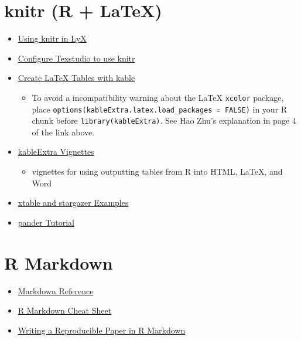 \documentclass[]{book}
\providecommand{\tightlist}{%
  \setlength{\itemsep}{0pt}\setlength{\parskip}{0pt}}
\begin{document}
\hypertarget{knitr-r-latex}{%
\section{knitr (R + LaTeX)}\label{knitr-r-latex}}

\begin{itemize}
\item
  \href{http://www.chrisbilder.com/stat850/LyXLaTeX/knitr/LyX-knitr1per.pdf}{Using knitr in LyX}
\item
  \href{https://www.pauljhurtado.com/teaching/software.html}{Configure Texstudio to use knitr}
\item
  \href{https://haozhu233.github.io/kableExtra/awesome_table_in_pdf.pdf}{Create LaTeX Tables with kable}

  \begin{itemize}
  \tightlist
  \item
    To avoid a incompatibility warning about the LaTeX \texttt{xcolor} package, place \texttt{options(kableExtra.latex.load\_packages\ =\ FALSE)} in your R chunk before \texttt{library(kableExtra)}. See Hao Zhu's explanation in page 4 of the link above.
  \end{itemize}
\item
  \href{http://haozhu233.github.io/kableExtra/}{kableExtra Vignettes}

  \begin{itemize}
  \tightlist
  \item
    vignettes for using outputting tables from R into HTML, LaTeX, and Word
  \end{itemize}
\item
  \href{https://rpubs.com/pankil/84526}{xtable and stargazer Examples}
\item
  \href{https://rapporter.github.io/pander/\#pander-an-r-pandoc-writer}{pander Tutorial}
\end{itemize}

\hypertarget{r-markdown}{%
\section{R Markdown}\label{r-markdown}}

\begin{itemize}
\tightlist
\item
  \href{https://github.com/adam-p/markdown-here/wiki/Markdown-Cheatsheet}{Markdown Reference}
\item
  \href{https://www.rstudio.com/wp-content/uploads/2016/03/rmarkdown-cheatsheet-2.0.pdf}{R Markdown Cheat Sheet}
\item
  \href{https://papers.ssrn.com/sol3/papers.cfm?abstract_id=3175518}{Writing a Reproducible Paper in R Markdown}
\end{itemize}
\end{document}
